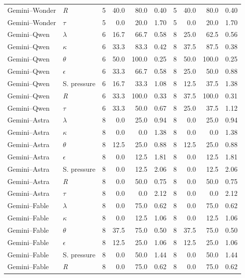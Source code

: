 \documentclass[11pt]{article}
\begin{document}
\begin{longtable}{@{}llrrrr@{\quad}rrrr@{}}
Gemini--Wonder & \textit{R} & 5 & 40.0 & 80.0 & 0.40 & 5 & 40.0 & 80.0 & 0.40 \\
Gemini--Wonder & $\tau$ & 5 & 0.0 & 20.0 & 1.70 & 5 & 0.0 & 20.0 & 1.70 \\ \addlinespace[3pt]
Gemini--Qwen & $\lambda$ & 6 & 16.7 & 66.7 & 0.58 & 8 & 25.0 & 62.5 & 0.56 \\
Gemini--Qwen & $\kappa$ & 6 & 33.3 & 83.3 & 0.42 & 8 & 37.5 & 87.5 & 0.38 \\
Gemini--Qwen & $\theta$ & 6 & 50.0 & 100.0 & 0.25 & 8 & 50.0 & 100.0 & 0.25 \\
Gemini--Qwen & $\epsilon$ & 6 & 33.3 & 66.7 & 0.58 & 8 & 25.0 & 50.0 & 0.88 \\
Gemini--Qwen & S. pressure & 6 & 16.7 & 33.3 & 1.08 & 8 & 12.5 & 37.5 & 1.38 \\
Gemini--Qwen & \textit{R} & 6 & 33.3 & 100.0 & 0.33 & 8 & 37.5 & 100.0 & 0.31 \\
Gemini--Qwen & $\tau$ & 6 & 33.3 & 50.0 & 0.67 & 8 & 25.0 & 37.5 & 1.12 \\ \addlinespace[3pt]
Gemini--Astra & $\lambda$ & 8 & 0.0 & 25.0 & 0.94 & 8 & 0.0 & 25.0 & 0.94 \\
Gemini--Astra & $\kappa$ & 8 & 0.0 & 0.0 & 1.38 & 8 & 0.0 & 0.0 & 1.38 \\
Gemini--Astra & $\theta$ & 8 & 12.5 & 25.0 & 0.88 & 8 & 12.5 & 25.0 & 0.88 \\
Gemini--Astra & $\epsilon$ & 8 & 0.0 & 12.5 & 1.81 & 8 & 0.0 & 12.5 & 1.81 \\
Gemini--Astra & S. pressure & 8 & 0.0 & 12.5 & 2.06 & 8 & 0.0 & 12.5 & 2.06 \\
Gemini--Astra & \textit{R} & 8 & 0.0 & 50.0 & 0.75 & 8 & 0.0 & 50.0 & 0.75 \\
Gemini--Astra & $\tau$ & 8 & 0.0 & 0.0 & 2.12 & 8 & 0.0 & 0.0 & 2.12 \\ \addlinespace[3pt]
Gemini--Fable & $\lambda$ & 8 & 0.0 & 75.0 & 0.62 & 8 & 0.0 & 75.0 & 0.62 \\
Gemini--Fable & $\kappa$ & 8 & 0.0 & 12.5 & 1.06 & 8 & 0.0 & 12.5 & 1.06 \\
Gemini--Fable & $\theta$ & 8 & 37.5 & 75.0 & 0.50 & 8 & 37.5 & 75.0 & 0.50 \\
Gemini--Fable & $\epsilon$ & 8 & 12.5 & 25.0 & 1.06 & 8 & 12.5 & 25.0 & 1.06 \\
Gemini--Fable & S. pressure & 8 & 0.0 & 50.0 & 1.44 & 8 & 0.0 & 50.0 & 1.44 \\
Gemini--Fable & \textit{R} & 8 & 0.0 & 75.0 & 0.62 & 8 & 0.0 & 75.0 & 0.62 \\

\end{longtable}
\end{document}
